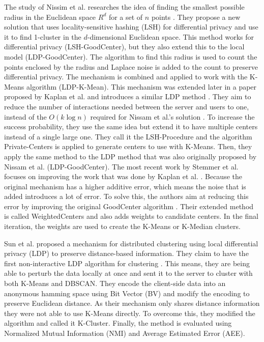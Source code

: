 The study of Nissim et al. researches the idea of finding the smallest possible radius in the Euclidean space  $R^d$ for a set of $n$ points \citep{nissim_clustering_2018}.
They propose a new solution that uses locality-sensitive hashing (LSH) for differential privacy and use it to find 1-cluster in the $d$-dimensional Euclidean space.
This method works for differential privacy (LSH-GoodCenter), but they also extend this to the local model (LDP-GoodCenter).
The algorithm to find this radius is used to count the points enclosed by the radius and Laplace noise is added to the count to preserve differential privacy. The mechanism is combined and applied to work with the K-Means algorithm (LDP-K-Mean).
This mechanism was extended later in a paper proposed by Kaplan et al. and introduces a similar LDP method \citep{kaplan_differentially_2018}.
They aim to reduce the number of interactions needed between the server and users to one, instead of the $O(k\log n)$ required for Nissam et al.’s solution \citep{nissim_clustering_2018}.
To increase the success probability, they use the same idea but extend it to have multiple centers instead of a single large one.
They call it the LSH-Procedure and the algorithm Private-Centers is applied to generate centers to use with K-Means.
Then, they apply the same method to the LDP method that was also originally proposed by Nissam et al. (LDP-GoodCenter).
The most recent work by Stemmer et al. focuses on improving the work that was done by Kaplan et al. \citep{kaplan_differentially_2018,stemmer_locally_2021}.
Because the original mechanism has a higher additive error, which means the noise that is added introduces a lot of error.
To solve this, the authors aim at reducing this error by improving the original GoodCenter algorithm \citep{nissim_clustering_2018}.
Their extended method is called WeightedCenters and also adds weights to candidate centers.
In the final iteration, the weights are used to create the K-Means or K-Median clusters.

Sun et al. proposed a mechanism for distributed clustering using local differential privacy (LDP) to preserve distance-based information.
They claim to have the first non-interactive LDP algorithm for clustering \citep{su_differentially_2015-1}.
This means, they are being able to perturb the data locally at once and sent it to the server to cluster with both K-Means and DBSCAN.
They encode the client-side data into an anonymous hamming space using Bit Vector (BV) and modify the encoding to preserve Euclidean distance.
As their mechanism only shares distance information they were not able to use K-Means directly.
To overcome this, they modified the algorithm and called it K-Cluster.
Finally, the method is evaluated using Normalized Mutual Information (NMI) and Average Estimated Error (AEE).

